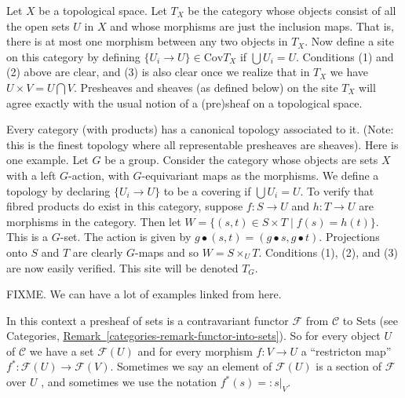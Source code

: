 \begin{example}
Let $X$ be a topological space.  Let $T_X$ be the category whose
objects consist of all the open sets $U$ in $X$ and whose morphisms
are just the inclusion maps.  That is, there is at most one morphism
between any two objects in $T_X$.  Now define a site on this
category by defining $\{U_i \to U\}\in \text{Cov} T_X$ if $\bigcup
U_i = U$. Conditions (1) and (2) above are clear, and (3) is also
clear once we realize that in $T_X$ we have $U \times V = U \bigcap V$.
Presheaves and sheaves (as defined below) on the site $T_X$ will
agree exactly with the usual notion of a (pre)sheaf on a topological
space.
\end{example}

\begin{example}
\label{example-site on group} Every category (with products) has a
canonical topology associated to it. (Note: this is the finest
topology where all representable presheaves are sheaves). Here is one
example. Let $G$ be a group. Consider the category whose objects are 
sets $X$ with a left $G$-action, with $G$-equivariant maps as the
morphisms.  We define a topology by declaring $\{U_i \to U\}$ to be 
a covering if $\bigcup U_i = U$. To verify that fibred products do 
exist in this category, suppose $f: S \rightarrow U$ and 
$h: T \rightarrow U$ are morphisms in the category. Then let 
$W = \{(s, t) \in S \times T \mid f(s) = h(t)\}$. This is a $G$-set. 
The action is given by $g \bullet(s,t) = (g \bullet s, g \bullet t)$.
Projections onto $S$ and $T$ are clearly $G$-maps and so 
$W = S \times_U T$.  Conditions (1), (2), and (3) are now easily 
verified. This site will be denoted $T_G$.
\end{example}

\begin{example}
FIXME. We can have a lot of examples linked from here.
\end{example}

\noindent
In this context a presheaf of sets is a contravariant functor
$\mathcal{F}$ from $\mathcal{C}$ to $\text{Sets}$ (see Categories, 
\hyperref[categories-remark-functor-into-sets]%
{Remark~\ref*{categories-remark-functor-into-sets}}). 
So for every object $U$ of $\mathcal{C}$ we have a set 
$\mathcal{F}(U)$ and for every morphism
$f : V \to U$ a ``restricton map'' $f^\ast : \mathcal{F}(U) \to 
\mathcal{F}(V)$. Sometimes we say an element
of $\mathcal{F}(U)$ is a section of $\mathcal{F}$ over $U$ , and sometimes
we use the notation $f^\ast(s) =: s|_V$. 

